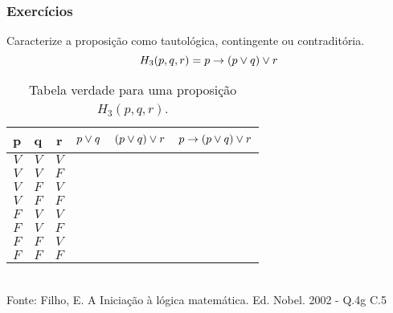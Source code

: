 \begin{frame}[t]
    \frametitle{Exercícios}
    \begin{exampleblock}{Caracterize a proposição como tautológica, contingente ou contraditória.}
        \begin{equation}
            H_3(p,q,r) = p \rightarrow (p \lor q) \lor r
        \end{equation}
    \end{exampleblock}
    \vspace{-2mm}
    \begin{table}[]
        \caption{Tabela verdade para uma proposição $H_3(p,q,r)$.}
        \label{tab:exercise-23}
        \begin{tabular}{|c|c|c|c|c|c|}
            \hline
            \rowcolor[HTML]{EFEFEF}
            \textbf{p} & \textbf{q} & \textbf{r} & $p \lor q$ & $(p \lor q) \lor r$ & $ p \rightarrow (p \lor q) \lor r$ \\ \hline
            $V$        & $V$        & $V$        &             &                      &                                \\ \hline
            $V$        & $V$        & $F$        &             &                      &                                \\ \hline
            $V$        & $F$        & $V$        &             &                      &                                \\ \hline
            $V$        & $F$        & $F$        &             &                      &                                \\ \hline
            $F$        & $V$        & $V$        &             &                      &                                \\ \hline
            $F$        & $V$        & $F$        &             &                      &                                \\ \hline
            $F$        & $F$        & $V$        &             &                      &                                \\ \hline
            $F$        & $F$        & $F$        &             &                      &                                \\ \hline
        \end{tabular}
        \\
        \centering \tiny{Fonte: Filho, E. A Iniciação à lógica matemática. Ed. Nobel. 2002 - Q.4g C.5}
    \end{table}
\end{frame}
